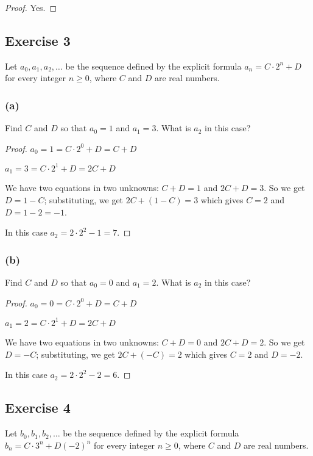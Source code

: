 \documentclass[14pt]{extarticle}
\begin{document}
\begin{proof}
    Yes.
\end{proof}

\subsection{Exercise 3}
Let \(a_0, a_1, a_2, \ldots\) be the sequence defined by the explicit formula \(a_n = C \cdot 2^n + D\) for every
integer \(n \geq 0\), where $C$ and $D$ are real numbers.

\subsubsection{(a)}
Find $C$ and $D$ so that \(a_0 = 1\) and \(a_1 = 3\). What is $a_2$ in this case?

\begin{proof}
    \(a_0 = 1 = C \cdot 2^0 + D = C + D\)

    \(a_1 = 3 = C \cdot 2^1 + D = 2C + D\)

    We have two equations in two unknowns: \(C+D = 1\) and \(2C+D = 3\). So we get $D = 1-C$; substituting, we get
    \(2C + (1-C) = 3\) which gives $C = 2$ and $D = 1-2 = -1$.

    In this case \(a_2 = 2 \cdot 2^2 - 1 = 7\).
\end{proof}

\subsubsection{(b)}
Find $C$ and $D$ so that \(a_0 = 0\) and \(a_1 = 2\). What is $a_2$ in this case?

\begin{proof}
    \(a_0 = 0 = C \cdot 2^0 + D = C + D\)

    \(a_1 = 2 = C \cdot 2^1 + D = 2C + D\)

    We have two equations in two unknowns: \(C+D = 0\) and \(2C+D = 2\). So we get $D = -C$; substituting, we get
    \(2C + (-C) = 2\) which gives $C = 2$ and $D = -2$.

    In this case \(a_2 = 2 \cdot 2^2 - 2 = 6\).
\end{proof}

\subsection{Exercise 4}
Let \(b_0, b_1, b_2, \ldots\) be the sequence defined by the explicit formula \(b_n = C \cdot 3^n + D(-2)^n\) for
every integer \(n \geq 0\), where $C$ and $D$ are real numbers.
\end{document}
